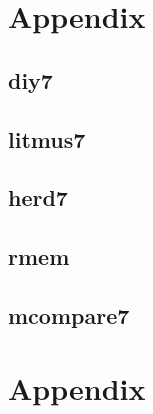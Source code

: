 
\setcounter{section}{0}

\section{Appendix}
\subsection{diy7}
\subsection{litmus7}

    


\subsection{herd7}

    


\subsection{rmem}

    


\subsection{mcompare7}

    



\newpage
\section{Appendix}

